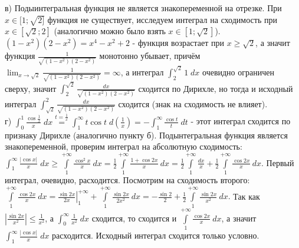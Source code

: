 \noindent в) Подыинтегральная функция не является знакопеременной на отрезке. При $x \in [1; \sqrt{2]}$ функция не существует, исследуем интеграл на сходимость при $x \in [\sqrt{2}; 2]$ (аналогично можно было взять $x \in [1; \sqrt{2}]$). \\ 
\((1-x^2)(2-x^2) = x^4 - x^2 + 2\) - функция возрастает при $x \geq \sqrt{2}$, а значит функция \(\frac{1}{\sqrt{(1-x^2)(2-x^2)}}\) монотонно убывает, причём \(\displaystyle \lim_{x \xrightarrow[]{} \sqrt2}{\frac{1}{\sqrt{(1-x^2)(2-x^2)}} = \infty}\), а интеграл \(\displaystyle \int_2^{\sqrt{2}}1 \; dx\) очевидно ограничен сверху, значит \(\displaystyle \int_2^{\sqrt{2}} \frac{dx}{\sqrt{(1-x^2)(2-x^2)}}\) сходится по Дирихле, но тогда и исходный интеграл \(\displaystyle \int_{\sqrt{2}}^{2} \frac{dx}{\sqrt{(1-x^2)(2-x^2)}}\) сходится (знак на сходимость не влияет). \\

\noindent г)  \(\displaystyle \int_0^{1}\frac{\cos{\frac{1}{x}}}{x} \; dx \stackrel{t = \frac{1}{x}}{=} \int_{1}^{\infty}t\cos{t} \; d\left(\frac{1}{x}\right) = -\int_1^{\infty}\frac{\cos{t}}{t} \; dt\) - этот интеграл сходится по признаку Дирихле (аналогично пункту б). Подынтегральная функция является знакопеременной, проверим интеграл на абсолютную сходимость: \\
\(\displaystyle \int_1^{\infty}\frac{|\cos{x}|}{x} \; dx \geq \int\limits_1^{+\infty} \frac{\cos^2 x}{x} \ dx = \frac{1}{2}\int\limits_1^{+\infty}\frac{1 + \cos 2x}{x} \ dx = \frac{1}{2}\int\limits_1^{+\infty}\frac{dx}{x} + \frac{1}{2}\int\limits_1^{+\infty}\frac{\cos 2x}{x} \ dx\). Первый интеграл, очевидно, расходится. Посмотрим на сходимость второго: \\
\(\displaystyle \int\limits_1^{+\infty}\frac{\cos 2x}{x} \ dx = \left. \frac{\sin 2x}{2x} \right|_1^{+\infty} + \int\limits_1^{+\infty} \frac{\sin 2x}{2x^2} \ dx = -\frac{\sin 2}{2} + \frac{1}{2}\int\limits_1^{+\infty}\frac{\sin 2x}{x^2} \ dx.\) Так как \(\displaystyle \left|\frac{\sin 2x}{x^2}\right| \leq \frac{1}{x^2}\), а \(\displaystyle \int_{0}^{\infty}\frac{1}{x^2} \; dx\) сходится, то сходится и \(\displaystyle \int\limits_1^{+\infty}\frac{\cos 2x}{x} \ dx\), а значит \(\displaystyle \int_1^{\infty}\frac{|\cos{x}|}{x} \; dx\) расходится. Исходный интеграл сходится только условно.

